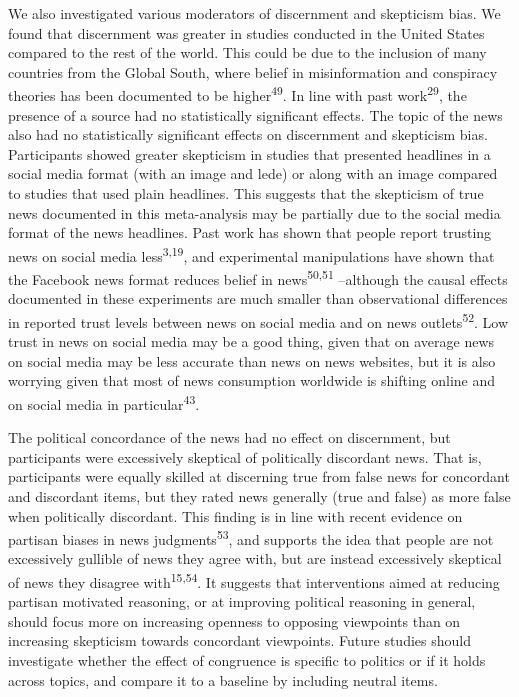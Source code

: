 \documentclass[
  man]{apa6}
\begin{document}
We also investigated various moderators of discernment and skepticism bias. We found that discernment was greater in studies conducted in the United States compared to the rest of the world. This could be due to the inclusion of many countries from the Global South, where belief in misinformation and conspiracy theories has been documented to be higher\textsuperscript{49}. In line with past work\textsuperscript{29}, the presence of a source had no statistically significant effects. The topic of the news also had no statistically significant effects on discernment and skepticism bias. Participants showed greater skepticism in studies that presented headlines in a social media format (with an image and lede) or along with an image compared to studies that used plain headlines. This suggests that the skepticism of true news documented in this meta-analysis may be partially due to the social media format of the news headlines. Past work has shown that people report trusting news on social media less\textsuperscript{3,19}, and experimental manipulations have shown that the Facebook news format reduces belief in news\textsuperscript{50,51} --although the causal effects documented in these experiments are much smaller than observational differences in reported trust levels between news on social media and on news outlets\textsuperscript{52}. Low trust in news on social media may be a good thing, given that on average news on social media may be less accurate than news on news websites, but it is also worrying given that most of news consumption worldwide is shifting online and on social media in particular\textsuperscript{43}.

The political concordance of the news had no effect on discernment, but participants were excessively skeptical of politically discordant news. That is, participants were equally skilled at discerning true from false news for concordant and discordant items, but they rated news generally (true and false) as more false when politically discordant. This finding is in line with recent evidence on partisan biases in news judgments\textsuperscript{53}, and supports the idea that people are not excessively gullible of news they agree with, but are instead excessively skeptical of news they disagree with\textsuperscript{15,54}. It suggests that interventions aimed at reducing partisan motivated reasoning, or at improving political reasoning in general, should focus more on increasing openness to opposing viewpoints than on increasing skepticism towards concordant viewpoints. Future studies should investigate whether the effect of congruence is specific to politics or if it holds across topics, and compare it to a baseline by including neutral items.
\end{document}
